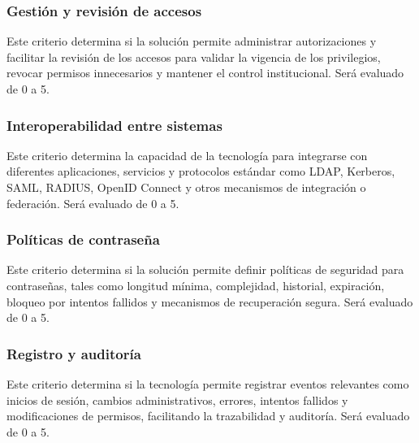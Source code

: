 \subsubsection{Gestión y revisión de accesos}

Este criterio determina si la solución permite administrar autorizaciones y facilitar la revisión de los accesos para validar la vigencia de los privilegios, revocar permisos innecesarios y mantener el control institucional. Será evaluado de 0 a 5.

\subsubsection{Interoperabilidad entre sistemas}

Este criterio determina la capacidad de la tecnología para integrarse con diferentes aplicaciones, servicios y protocolos estándar como \ac{LDAP}, Kerberos, \ac{SAML}, \ac{RADIUS}, OpenID Connect y otros mecanismos de integración o federación. Será evaluado de 0 a 5.

\subsubsection{Políticas de contraseña}

Este criterio determina si la solución permite definir políticas de seguridad para contraseñas, tales como longitud mínima, complejidad, historial, expiración, bloqueo por intentos fallidos y mecanismos de recuperación segura. Será evaluado de 0 a 5.

\subsubsection{Registro y auditoría}

Este criterio determina si la tecnología permite registrar eventos relevantes como inicios de sesión, cambios administrativos, errores, intentos fallidos y modificaciones de permisos, facilitando la trazabilidad y auditoría. Será evaluado de 0 a 5.
